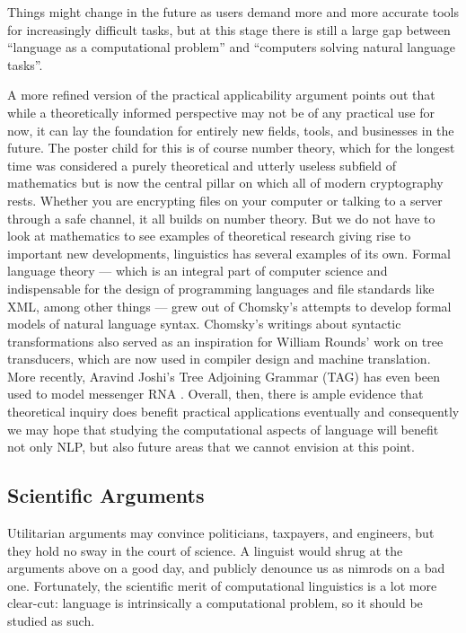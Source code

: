 Things might change in the future as users demand more and more accurate tools for increasingly difficult tasks, but at this stage there is still a large gap between ``language as a computational problem'' and ``computers solving natural language tasks''.

A more refined version of the practical applicability argument points out that while a theoretically informed perspective may not be of any practical use for now, it can lay the foundation for entirely new fields, tools, and businesses in the future.
The poster child for this is of course number theory, which for the longest time was considered a purely theoretical and utterly useless subfield of mathematics but is now the central pillar on which all of modern cryptography rests.
Whether you are encrypting files on your computer or talking to a server through a safe channel, it all builds on number theory.
But we do not have to look at mathematics to see examples of theoretical research giving rise to important new developments, linguistics has several examples of its own.
Formal language theory --- which is an integral part of computer science and indispensable for the design of programming languages and file standards like XML, among other things --- grew out of Chomsky's attempts to develop formal models of natural language syntax.
Chomsky's writings about syntactic transformations also served as an inspiration for William Rounds' \citep{Rounds70} work on tree transducers, which are now used in compiler design and machine translation.
More recently, Aravind Joshi's Tree Adjoining Grammar (TAG) has even been used to model messenger RNA \citep{Uemura.etal99, Matsui.etal05}.
Overall, then, there is ample evidence that theoretical inquiry does benefit practical applications eventually and consequently we may hope that studying the computational aspects of language will benefit not only NLP, but also future areas that we cannot envision at this point.

\subsection{Scientific Arguments}

Utilitarian arguments may convince politicians, taxpayers, and engineers, but they hold no sway in the court of science.
A linguist would shrug at the arguments above on a good day, and publicly denounce us as nimrods on a bad one.
Fortunately, the scientific merit of computational linguistics is a lot more clear-cut: language is intrinsically a computational problem, so it should be studied as such.

